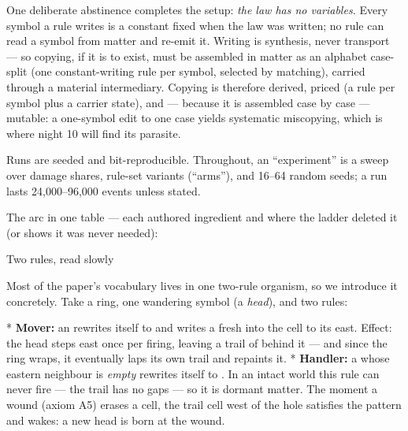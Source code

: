One deliberate abstinence completes the setup: {\it the law has
no variables.} Every symbol a rule writes is a constant fixed when
the law was written; no rule can read a symbol from matter and
re-emit it. Writing is synthesis, never transport --- so copying,
if it is to exist, must be assembled in matter as an alphabet
case-split (one constant-writing rule per symbol, selected by
matching), carried through a material intermediary. Copying is
therefore derived, priced (a rule per symbol plus a carrier
state), and --- because it is assembled case by case --- mutable:
a one-symbol edit to one case yields systematic miscopying, which
is where night 10 will find its parasite.

Runs are seeded and bit-reproducible. Throughout, an
“experiment” is a sweep over damage shares, rule-set variants
(“arms”), and 16--64 random seeds; a run lasts 24{,}000--96{,}000
events unless stated.

\medskip
\noindent The arc in one table --- each authored ingredient and
where the ladder deleted it (or shows it was never needed):

\medskip
\noindent{}
\medskip

\sec Two rules, read slowly

Most of the paper's vocabulary lives in one two-rule organism, so
we introduce it concretely. Take a ring, one wandering symbol 
(a {\it head}), and two rules:

\begitems
* {\bf Mover:} an  rewrites itself to  and writes a fresh
 into the cell to its east. Effect: the head steps east once
per firing, leaving a trail of  behind it --- and since the
ring wraps, it eventually laps its own trail and repaints it.
* {\bf Handler:} a  whose eastern neighbour is {\it empty}
rewrites itself to . In an intact world this rule can never
fire --- the trail has no gaps --- so it is dormant matter. The
moment a wound (axiom A5) erases a cell, the trail cell west of the
hole satisfies the pattern and wakes: a new head is born at the
wound.
\enditems

